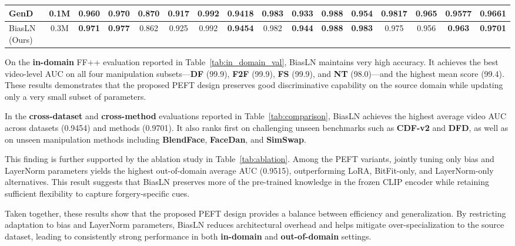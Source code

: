 \documentclass[fonts]{icst}
\begin{document}
\begin{strip}
{\begin{tabular}{l c cccccc cccccccc}
GenD~\cite{yermakov2025gend} & 0.1M & \cellcolor{gray!15}0.960 & 0.970 & \cellcolor{gray!15}0.870 & 0.917 & \cellcolor{gray!15}0.992 & 0.9418 & 
\textbf{0.983} & \cellcolor{gray!15}0.933 & \textbf{0.988} & \cellcolor{gray!15}0.954 & \textbf{0.9817} & \textbf{0.965} & \cellcolor{gray!15}0.9577 & \cellcolor{gray!15}0.9661 \\ \midrule
BiasLN (Ours) & 0.3M & \textbf{0.971} & \textbf{0.977} & 0.862 & \cellcolor{gray!15}0.925 & \cellcolor{gray!15}0.992 & \textbf{0.9454} & \cellcolor{gray!15}0.982 & \textbf{0.944} & \textbf{0.988} & \textbf{0.983} & \cellcolor{gray!15}0.975 & \cellcolor{gray!15}0.956 & \textbf{0.963} & \textbf{0.9701} \\
\bottomrule
\end{tabular}
}
\end{strip}


On the \textbf{in-domain} FF++ evaluation reported in Table~\ref{tab:in_domain_val}, BiasLN maintains very high accuracy. It achieves the best video-level AUC on all four manipulation subsets---\textbf{DF} (99.9), \textbf{F2F} (99.9), \textbf{FS} (99.9), and \textbf{NT} (98.0)---and the highest mean score (99.4). These results demonstrates that the proposed PEFT design preserves good discriminative capability on the source domain while updating only a very small subset of parameters.

In the \textbf{cross-dataset} and \textbf{cross-method} evaluations reported in Table~\ref{tab:comparison}, BiasLN achieves the highest average video AUC across datasets (0.9454) and methods (0.9701). It also ranks first on challenging unseen benchmarks such as \textbf{CDF-v2} and \textbf{DFD}, as well as on unseen manipulation methods including \textbf{BlendFace}, \textbf{FaceDan}, and \textbf{SimSwap}.

This finding is further supported by the ablation study in Table~\ref{tab:ablation}. Among the PEFT variants, jointly tuning only bias and LayerNorm parameters yields the highest out-of-domain average AUC (0.9515), outperforming LoRA, BitFit-only, and LayerNorm-only alternatives. This result suggests that BiasLN preserves more of the pre-trained knowledge in the frozen CLIP encoder while retaining sufficient flexibility to capture forgery-specific cues.

Taken together, these results show that the proposed PEFT design provides a balance between efficiency and generalization. By restricting adaptation to bias and LayerNorm parameters, BiasLN reduces architectural overhead and helps mitigate over-specialization to the source dataset, leading to consistently strong performance in both \textbf{in-domain} and \textbf{out-of-domain} settings.
\end{document}
